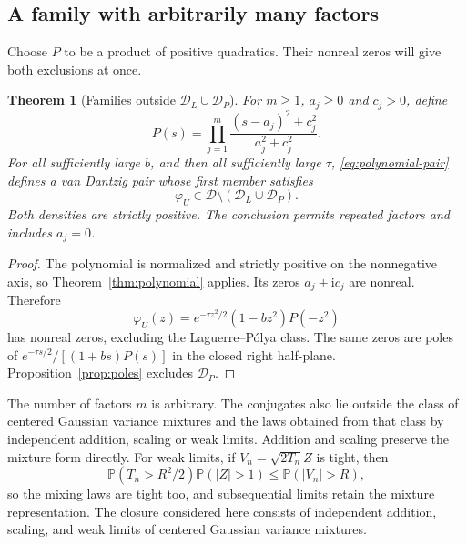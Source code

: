 \documentclass[11pt,twoside]{article}
\theoremstyle{journalplain}
\numberwithin{equation}{section}
\newtheorem{theorem}{Theorem}[section]
\theoremstyle{journaldefinition}
\newcommand{\Prob}{\mathbb P}
\newcommand{\D}{\mathcal D}
\newcommand{\DL}{\mathcal D_L}
\newcommand{\DP}{\mathcal D_P}
\newcommand{\ii}{\mathrm i}
\begin{document}
\subsection{A family with arbitrarily many factors}
Choose $P$ to be a product of positive quadratics. Their nonreal zeros will give both exclusions at once.
\begin{theorem}[Families outside $\DL\cup\DP$]\label{thm:families}
For $m\ge1$, $a_j\ge0$ and $c_j>0$, define
\begin{equation}\label{eq:family}
 P(s)=\prod_{j=1}^m\frac{(s-a_j)^2+c_j^2}{a_j^2+c_j^2}.
\end{equation}
For all sufficiently large $b$, and then all sufficiently large $\tau$, \eqref{eq:polynomial-pair} defines a van Dantzig pair whose first member satisfies
\begin{equation}\label{eq:outside}
 \varphi_U\in\D\setminus(\DL\cup\DP).
\end{equation}
Both densities are strictly positive. The conclusion permits repeated factors and includes $a_j=0$.
\end{theorem}
\begin{proof}
The polynomial is normalized and strictly positive on the nonnegative axis, so Theorem~\ref{thm:polynomial} applies. Its zeros $a_j\pm\ii c_j$ are nonreal. Therefore
\[
 \varphi_U(z)=e^{-\tau z^2/2}(1-bz^2)P(-z^2)
\]
has nonreal zeros, excluding the Laguerre--P\'olya class. The same zeros are poles of $e^{-\tau s/2}/[(1+bs)P(s)]$ in the closed right half-plane. Proposition~\ref{prop:poles} excludes $\DP$.
\end{proof}
The number of factors $m$ is arbitrary. The conjugates also lie outside the class of centered Gaussian variance mixtures and the laws obtained from that class by independent addition, scaling or weak limits. Addition and scaling preserve the mixture form directly. For weak limits, if $V_n=\sqrt{2T_n}Z$ is tight, then
\[
 \Prob(T_n>R^2/2)\Prob(|Z|>1)\le\Prob(|V_n|>R),
\]
so the mixing laws are tight too, and subsequential limits retain the mixture representation. The closure considered here consists of independent addition, scaling, and weak limits of centered Gaussian variance mixtures.
\end{document}
